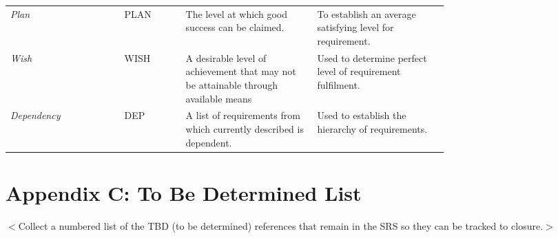 \begin{appendices}
\begin{table}[!htbp]
\begin{tabular}{@{}lp{0.14\linewidth}p{0.3\linewidth}p{0.3\linewidth}@{}}
			\emph{Plan}				 & PLAN    & The level at which good success can be claimed. & To establish an average satisfying level for requirement. \\
			\emph{Wish}			 	 & WISH    & A desirable level of achievement that may not be attainable through available means & Used to determine perfect level of requirement fulfilment.\\
			\emph{Dependency}		 & DEP     & A list of requirements from which currently described is dependent. & Used to establish the hierarchy of requirements.\\
			\bottomrule
		\end{tabular}
	\end{table}
	\section{Appendix C: To Be Determined List}
	$<$Collect a numbered list of the TBD (to be determined) references that remain 
	in the SRS so they can be tracked to closure.$>$
\end{appendices}